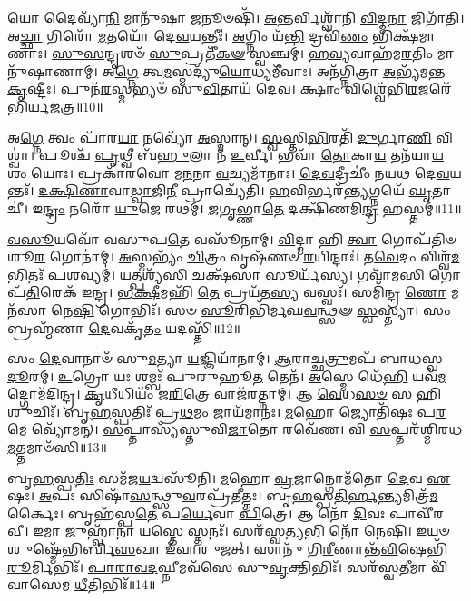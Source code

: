 𑌯𑍋 𑌦𑍈𑌵𑍍𑌯𑌾᳴\-\ul{𑌨𑌿} 𑌮𑌾𑌨𑍁᳴𑌷𑌾 \ul{𑌜}\-𑌨𑍂𑍞𑌷𑌿᳴।
\-\ul{𑌅}\-𑌨𑍍𑌤𑌰𑍍𑌵𑌿𑌶𑍍𑌵𑌾᳴𑌨𑌿 \ul{𑌵𑌿}\-𑌦𑍍𑌮\-\ul{𑌨𑌾} 𑌜𑌿𑌗𑌾᳴𑌤𑌿।
𑌅\-\ul{𑌚𑍍𑌛𑌾} 𑌗𑌿𑌰𑍋᳴ \ul{𑌮}\-𑌤𑌯𑍋᳴ 𑌦𑍇\-\ul{𑌵}\-𑌯𑌨𑍍𑌤𑍀𑌃॑।
\-\ul{𑌅}\-𑌗𑍍𑌨𑌿𑌂 𑌯᳴\-\ul{𑌨𑍍𑌤𑌿} 𑌦𑍍𑌰𑌵𑌿᳴\-\ul{𑌣𑌂} 𑌭𑌿𑌕𑍍𑌷᳴𑌮𑌾𑌣𑌾𑌃।
\-\ul{𑌸𑍁}\-\-\ul{𑌸}\-𑌨𑍍𑌦𑍃𑌶𑍞᳴ \ul{𑌸𑍁}\-𑌪𑍍𑌰𑌤𑍀᳴\-\ul{𑌕}\-\-\ul{𑍟} 𑌸𑍍𑌵𑌞𑍍𑌚𑌮𑍍॑।
\-\ul{𑌹}\-\-\ul{𑌵𑍍𑌯}\-𑌵𑌾𑌹᳴𑌮\-\ul{𑌰}\-𑌤𑌿𑌂 𑌮𑌾𑌨𑍁᳴𑌷𑌾𑌣𑌾𑌮𑍍।
𑌅\-\ul{𑌗𑍍𑌨𑍇} 𑌤𑍍𑌵\-\ul{𑌮}\-𑌸𑍍𑌮𑌦𑍍𑌯𑍁᳴\-\ul{𑌯𑍋}\-𑌧𑍍𑌯𑌮𑍀᳴𑌵𑌾𑌃।
𑌅𑌨᳴𑌗𑍍𑌨𑌿𑌤𑍍𑌰𑌾 \ul{𑌅}\-𑌭𑍍𑌯᳴𑌮𑌨𑍍𑌤 \ul{𑌕𑍃}\-𑌷𑍍𑌟𑍀𑌃।
𑌪𑍁𑌨᳴\-\ul{𑌰}\-𑌸𑍍𑌮𑌭𑍍𑌯𑍞᳴ 𑌸𑍁\-\ul{𑌵𑌿}\-𑌤𑌾𑌯᳴ 𑌦𑍇𑌵।
𑌕𑍍𑌷𑌾𑌂 𑌵𑌿𑌶𑍍𑌵𑍇᳴𑌭𑌿\-\ul{𑌰}\-𑌜𑌰𑍇᳴𑌭𑌿𑌰𑍍𑌯𑌜𑌤𑍍𑌰॥10॥

𑌅\-\ul{𑌗𑍍𑌨𑍇} 𑌤𑍍𑌵𑌂 𑌪𑌾᳴𑌰\-\ul{𑌯𑌾} 𑌨𑌵𑍍𑌯𑍋᳴ \ul{𑌅}\-𑌸𑍍𑌮𑌾𑌨𑍍।
\-\ul{𑌸𑍍𑌵}\-𑌸𑍍𑌤𑌿\-\ul{𑌭𑌿}\-𑌰𑌤𑌿᳴ \ul{𑌦𑍁}\-𑌰𑍍𑌗𑌾\-\ul{𑌣𑌿} 𑌵𑌿𑌶𑍍𑌵𑌾॑।
𑌪𑍂𑌶𑍍𑌚᳴ \ul{𑌪𑍃}\-𑌥𑍍𑌵𑍀 𑌬᳴\-\ul{𑌹𑍁}\-𑌲𑌾 𑌨᳴ \ul{𑌉}\-𑌰𑍍𑌵𑍀।
𑌭𑌵𑌾᳴ \ul{𑌤𑍋}\-𑌕𑌾\-\ul{𑌯} 𑌤𑌨᳴𑌯𑌾\-\ul{𑌯} 𑌶𑌂 𑌯𑍋𑌃।
𑌪𑍍𑌰𑌕𑌾᳴𑌰𑌵𑍋 𑌮\-\ul{𑌨}\-𑌨𑌾 \ul{𑌵}\-𑌚𑍍𑌯𑌮𑌾᳴𑌨𑌾𑌃।
\-\ul{𑌦𑍇}\-\-\ul{𑌵}\-𑌦𑍍𑌰𑍀𑌚𑍀𑌂॑ 𑌨𑌯𑌥 𑌦𑍇\-\ul{𑌵}\-𑌯𑌨𑍍𑌤𑌃᳴।
\-\ul{𑌦}\-\-\ul{𑌕𑍍𑌷𑌿}\-\-\ul{𑌣𑌾}\-𑌵𑌾\-\ul{𑌡𑍍𑌵𑌾}\-𑌜𑌿\-\ul{𑌨𑍀} 𑌪𑍍𑌰𑌾𑌚𑍍𑌯𑍇᳴𑌤𑌿।
\-\ul{𑌹}\-𑌵𑌿𑌰𑍍𑌭𑌰᳴\-\ul{𑌨𑍍𑌤𑍍𑌯}\-𑌗𑍍𑌨𑌯𑍇᳴ \ul{𑌘𑍃}\-𑌤𑌾𑌚𑍀॑।
𑌇\-\ul{𑌨𑍍𑌦𑍍𑌰𑌂} 𑌨𑌰𑍋᳴ \ul{𑌯𑍁}\-𑌜𑍇 𑌰𑌥𑌮𑍍॑।
\-\ul{𑌜}\-\-\ul{𑌗𑍃}\-𑌭𑍍𑌣𑌾\-\ul{𑌤𑍇} 𑌦𑌕𑍍𑌷𑌿᳴𑌣𑌮𑌿\-\ul{𑌨𑍍𑌦𑍍𑌰} 𑌹𑌸𑍍𑌤𑌮𑍍॑॥11॥

\-\ul{𑌵}\-\-\ul{𑌸𑍂}\-𑌯𑌵𑍋᳴ 𑌵𑌸𑍁𑌪\-\ul{𑌤𑍇} 𑌵𑌸𑍂᳴𑌨𑌾𑌮𑍍।
\-\ul{𑌵𑌿}\-𑌦𑍍𑌮𑌾 𑌹𑌿 \ul{𑌤𑍍𑌵𑌾} 𑌗𑍋𑌪᳴𑌤𑌿𑍞 𑌶𑍂\-\ul{𑌰} 𑌗𑍋𑌨𑌾॑𑌮𑍍।
\-\ul{𑌅}\-𑌸𑍍𑌮𑌭𑍍𑌯𑌂᳴ \ul{𑌚𑌿}\-𑌤𑍍𑌰𑌂 𑌵𑍃𑌷᳴𑌣𑍞 \ul{𑌰}\-𑌯𑌿𑌨𑍍𑌦𑌾𑌃॑।
𑌤\-\ul{𑌵𑍇}\-𑌦𑌂 𑌵𑌿𑌶𑍍𑌵᳴\-\ul{𑌮}\-𑌭𑌿𑌤𑌃᳴ 𑌪\-\ul{𑌶}\-𑌵𑍍𑌯𑌮𑍍॑।
𑌯𑌤𑍍𑌪𑌶𑍍𑌯᳴\-\ul{𑌸𑌿} 𑌚𑌕𑍍𑌷᳴\-\ul{𑌸𑌾} 𑌸𑍂𑌰𑍍𑌯᳴𑌸𑍍𑌯।
𑌗𑌵𑌾᳴𑌮\-\ul{𑌸𑌿} 𑌗𑍋𑌪᳴\-\ul{𑌤𑌿}\-𑌰𑍇𑌕᳴ 𑌇𑌨𑍍𑌦𑍍𑌰।
\-\ul{𑌭}\-\-\ul{𑌕𑍍𑌷𑍀}\-𑌮𑌹𑌿᳴ \ul{𑌤𑍇} 𑌪𑍍𑌰𑌯᳴𑌤\-\ul{𑌸𑍍𑌯} 𑌵𑌸𑍍𑌵𑌃᳴।
𑌸𑌮𑌿᳴𑌨𑍍𑌦𑍍𑌰 \ul{𑌣𑍋} 𑌮𑌨᳴𑌸𑌾 𑌨𑍇\-\ul{𑌷𑌿} 𑌗𑍋𑌭𑌿𑌃᳴।
𑌸𑍞 \ul{𑌸𑍂}\-𑌰𑌿𑌭𑌿᳴𑌰𑍍𑌮𑌘\-\ul{𑌵}\-𑌨𑍍𑌥𑍍𑌸𑍟 \ul{𑌸𑍍𑌵}\-𑌸𑍍𑌤𑍍𑌯𑌾।
𑌸𑌂 𑌬𑍍𑌰𑌹𑍍𑌮᳴𑌣𑌾 \ul{𑌦𑍇}\-𑌵𑌕𑍃᳴\-\ul{𑌤𑌂} 𑌯𑌦𑌸𑍍𑌤𑌿᳴॥12॥

𑌸𑌂 \ul{𑌦𑍇}\-𑌵𑌾𑌨𑌾𑍞᳴ 𑌸𑍁\-\ul{𑌮}\-𑌤𑍍𑌯𑌾 \ul{𑌯}\-𑌜𑍍𑌞𑌿𑌯𑌾᳴𑌨𑌾𑌮𑍍।
\-\ul{𑌆}\-𑌰𑌾𑌚𑍍𑌛\-\ul{𑌤𑍍𑌰𑍁}\-𑌮𑌪᳴ 𑌬𑌾𑌧𑌸𑍍𑌵 \ul{𑌦𑍂}\-𑌰𑌮𑍍।
\-\ul{𑌉}\-𑌗𑍍𑌰𑍋 𑌯𑌃 𑌶𑌮𑍍𑌬𑌃᳴ 𑌪𑍁𑌰𑍁𑌹𑍂\-\ul{𑌤} 𑌤𑍇𑌨᳴।
\-\ul{𑌅}\-𑌸𑍍𑌮𑍇 𑌧𑍇᳴\-\ul{𑌹𑌿} 𑌯𑌵᳴\-\ul{𑌮}\-𑌦𑍍𑌗𑍋𑌮᳴𑌦𑌿𑌨𑍍𑌦𑍍𑌰।
\-\ul{𑌕𑍃}\-𑌧𑍀𑌧𑌿𑌯𑌂᳴ 𑌜\-\ul{𑌰𑌿}\-𑌤𑍍𑌰𑍇 𑌵𑌾𑌜᳴𑌰𑌤𑍍𑌨𑌾𑌮𑍍।
𑌆 \ul{𑌵𑍇}\-𑌧\-\ul{𑌸}\-\-\ul{𑍞} 𑌸 𑌹𑌿 𑌶𑍁𑌚𑌿𑌃᳴।
𑌬𑍃\-\ul{𑌹}\-𑌸𑍍𑌪𑌤𑌿𑌃᳴ 𑌪𑍍𑌰\-\ul{𑌥}\-𑌮𑌂 𑌜𑌾𑌯᳴𑌮𑌾𑌨𑌃।
\-\ul{𑌮}\-𑌹𑍋 𑌜𑍍𑌯𑍋𑌤𑌿᳴𑌷𑌃 𑌪\-\ul{𑌰}\-𑌮𑍇 𑌵𑍍𑌯𑍋᳴𑌮𑌨𑍍।
\-\ul{𑌸}\-𑌪𑍍𑌤𑌾𑌸𑍍𑌯᳴𑌸𑍍𑌤𑍁𑌵𑌿\-\ul{𑌜𑌾}\-𑌤𑍋 𑌰𑌵𑍇᳴𑌣।
𑌵𑌿 \ul{𑌸}\-𑌪𑍍𑌤𑌰᳴𑌶𑍍𑌮𑌿𑌰𑌧\-\ul{𑌮}\-𑌤𑍍𑌤𑌮𑌾𑍞᳴𑌸𑌿॥13॥

𑌬𑍃\-\ul{𑌹}\-𑌸𑍍𑌪\-\ul{𑌤𑌿𑌃} 𑌸𑌮᳴𑌜\-\ul{𑌯}\-𑌦𑍍𑌵𑌸𑍂᳴𑌨𑌿।
\-\ul{𑌮}\-𑌹𑍋 \ul{𑌵𑍍𑌰}\-𑌜𑌾𑌨𑍍𑌗𑍋𑌮᳴𑌤𑍋 \ul{𑌦𑍇}\-𑌵 \ul{𑌏}\-𑌷𑌃।
\-\ul{𑌅}\-𑌪𑌃 𑌸𑌿𑌷𑌾᳴\-\ul{𑌸}\-𑌨𑍍𑌥𑍍𑌸𑍁\-\ul{𑌵}\-𑌰𑌪𑍍𑌰᳴𑌤𑍀𑌤𑍍𑌤𑌃।
𑌬𑍃\-\ul{𑌹}\-𑌸𑍍𑌪\-\ul{𑌤𑌿}\-\-\ul{𑌰𑍍}\-𑌹\-\ul{𑌨𑍍𑌤𑍍𑌯}\-𑌮𑌿𑌤𑍍𑌰᳴\-\ul{𑌮}\-𑌰𑍍𑌕𑍈𑌃।
𑌬𑍃𑌹᳴𑌸𑍍𑌪\-\ul{𑌤𑍇} 𑌪\-\ul{𑌰𑍍𑌯𑍇}\-𑌵𑌾 \ul{𑌪𑌿}\-𑌤𑍍𑌰𑍇।
𑌆 𑌨𑍋᳴ \ul{𑌦𑌿}\-𑌵𑌃 𑌪𑌾𑌵𑍀᳴𑌰𑌵𑍀।
\-\ul{𑌇}\-𑌮𑌾 𑌜𑍁𑌹𑍍𑌵𑌾᳴\-\ul{𑌨𑌾} 𑌯\-\ul{𑌸𑍍𑌤𑍇} 𑌸𑍍𑌤𑌨𑌃᳴।
𑌸𑌰᳴𑌸𑍍𑌵\-\ul{𑌤𑍍𑌯}\-𑌭𑌿 𑌨𑍋᳴ 𑌨𑍇𑌷𑌿।
\-\ul{𑌇}\-𑌯𑍞 𑌶𑍁𑌷𑍍𑌮𑍇᳴𑌭𑌿𑌰𑍍𑌬𑌿\-\ul{𑌸}\-𑌖𑌾 𑌇᳴𑌵𑌾𑌰𑍁𑌜𑌤𑍍।
𑌸𑌾𑌨𑍁᳴ 𑌗𑌿\-\ul{𑌰𑍀}\-𑌣𑌾𑌨𑍍𑌤᳴\-\ul{𑌵𑌿}\-𑌷𑍇𑌭𑌿᳴\-\ul{𑌰𑍂}\-𑌰𑍍𑌮𑌿𑌭𑌿𑌃᳴।
\-\ul{𑌪𑌾}\-\-\ul{𑌰𑌾}\-\-\ul{𑌵}\-\-\ul{𑌦}\-𑌘𑍍𑌨𑍀𑌮𑌵᳴𑌸𑍇 𑌸𑍁\-\ul{𑌵𑍃}\-𑌕𑍍𑌤𑌿𑌭𑌿𑌃᳴।
𑌸𑌰᳴𑌸𑍍𑌵\-\ul{𑌤𑍀}\-𑌮𑌾 𑌵𑌿᳴𑌵𑌾𑌸𑍇𑌮 \ul{𑌧𑍀}\-𑌤𑌿𑌭𑌿𑌃᳴॥14॥\anuvakamend[\-\ul{𑌦𑍇}\-\-\ul{𑌵}\-𑌯𑌾𑌨𑍈॑\-\ul{𑌰𑍍𑌦𑍇}\-𑌵𑌾𑌃 𑌸𑍁𑌪𑍂᳴𑌤𑌂 𑌯𑌜\-\ul{𑌤𑍍𑌰} 𑌹\-\ul{𑌸𑍍𑌤}\-𑌮\-\ul{𑌸𑍍𑌤𑌿} 𑌤𑌮𑌾𑍟᳴\-\ul{𑌸𑍍𑌯𑍂}\-𑌰𑍍𑌮𑌿\-\ul{𑌭𑌿}\-𑌰𑍍𑌦𑍍𑌵𑍇 𑌚᳴]

